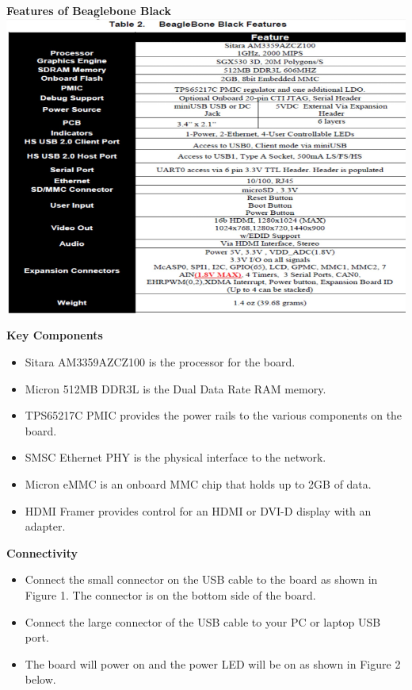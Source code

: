 \documentclass[a4paper,12pt]{article}
\begin{document}
	\textbf{Features of Beaglebone Black}\\
	\includegraphics[width=\textwidth]{features_bbb.png}
	
	\textbf{Key Components}
	\begin{itemize}
		\item Sitara AM3359AZCZ100 is the processor for the board. 
		\item Micron 512MB DDR3L is the Dual Data Rate RAM memory. 
		\item TPS65217C PMIC provides the power rails to the various components on the board. 
		\item SMSC Ethernet PHY is the physical interface to the network. 
		\item Micron eMMC is an onboard MMC chip that holds up to 2GB of data. 
		\item HDMI Framer provides control for an HDMI or DVI-D display with an adapter. 
	\end{itemize}
	\vspace{30px}
	
	
	\textbf{Connectivity}
	\begin{itemize}
		\item Connect the small connector on the USB cable to the board as shown in Figure 1. The connector is on the bottom side of the board. 
		\item Connect the large connector of the USB cable to your PC or laptop USB port. 
		\item The board will power on and the power LED will be on as shown in Figure 2 below. 
	\end{itemize}
	
\end{document}

